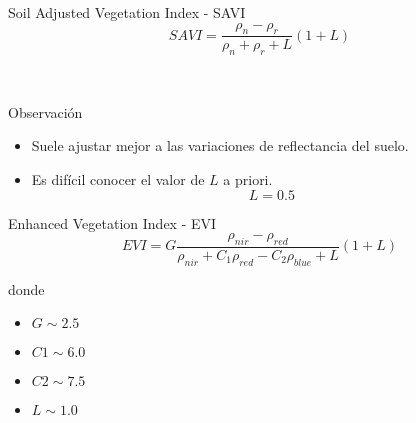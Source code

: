 \begin{frame}{}
    \begin{block}{Soil Adjusted Vegetation Index - SAVI}
        \begin{equation}
            SAVI = \frac{\rho_n-\rho_r}{\rho_n+\rho_r+L}(1+L)
        \end{equation}
    \end{block}\pause\
    \begin{block}{Observación}
        \begin{itemize}
            \item Suele ajustar mejor a las variaciones de reflectancia del
                suelo.
            \item Es difícil conocer el valor de $L$ a priori. \begin{equation}
        L=0.5
    \end{equation}
        \end{itemize}
    \end{block}
\end{frame}

\begin{frame}{}
    \begin{block}{Enhanced Vegetation Index - EVI}
        \begin{equation}
            EVI = G\frac{\rho_{nir} - \rho_{red}}{\rho_{nir}+C_1\rho_{red}-C_2\rho_{blue}+L}(1+L)
        \end{equation}
    \end{block}
    donde
    \begin{itemize}
        \item $G  \sim 2.5$
        \item $C1 \sim 6.0$
        \item $C2 \sim 7.5$
        \item $L  \sim 1.0$
    \end{itemize}
\end{frame}

\gracias
